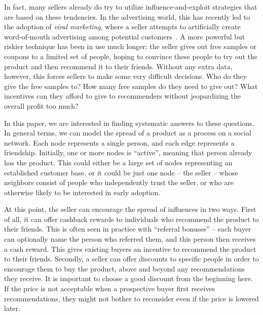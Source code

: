 \documentclass[letterpaper,twoside]{article}
\begin{document}
In fact, many sellers already do try to utilize influence-and-exploit strategies that are based on
these tendencies. In the advertising world, this has recently led to the adoption
of {\em viral marketing}, where a seller attempts to artificially create word-of-mouth
advertising among potential customers~\cite{LSK06,LAH07,Schon08}. A more powerful but riskier
technique has been in use much longer: the seller gives out free samples
or coupons to a limited set of people, hoping to convince these people to try out the product and then
recommend it to their friends. Without any extra data, however, this forces sellers
to make some very difficult decisions. Who do they give the free samples to? How many free
samples do they need to give out? What incentives can they afford to give to recommenders
without jeopardizing the overall profit too much?

In this paper, we are interested in finding systematic answers to these questions. In general
terms, we can model the spread of a product as a process on a social network. Each node
represents a single person, and each edge represents a friendship. Initially, one or more
nodes is ``active'', meaning that person already has the product. This could either be a large set of
nodes representing an established customer base, or it could be just one node -- the seller --
whose neighbors consist of people who independently trust the seller, or who are otherwise
likely to be interested in early adoption.

At this point, the seller can encourage the spread of influences in two ways. First of all, it can offer
cashback rewards to individuals who recommend the product to their friends. This is often seen in practice
with ``referral bonuses'' -- each buyer can optionally name the person who referred them, and this person
then receives a cash reward. This gives existing buyers an incentive to recommend the product to
their friends. Secondly, a seller can offer discounts to specific people in order to encourage them to
buy the product, above and beyond any recommendations they receive. It is important to choose a good discount from
the beginning here. If the price is not acceptable when a prospective buyer first receives recommendations,
they might not bother to reconsider even if the price is lowered later.
\end{document}
